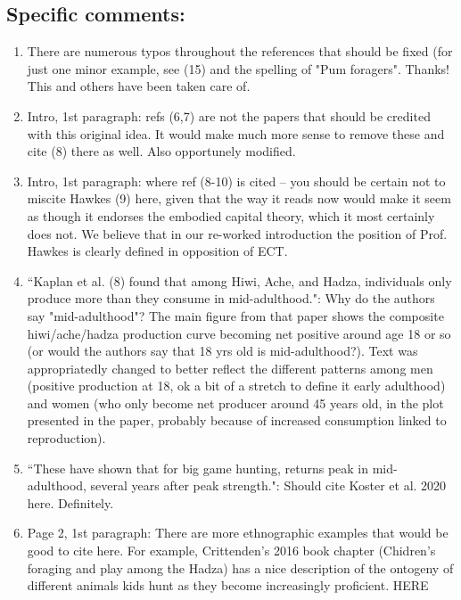 \documentclass{article}
\newcommand{\rev}[1]{{\color{ForestGreen}#1}}
\begin{document}
\subsection{Specific comments:}

\begin{enumerate}
    \item There are numerous typos throughout the references that should be fixed (for just one minor example, see (15) and the spelling of "Pum foragers". \rev{Thanks! This and others have been taken care of.}
    
    \item Intro, 1st paragraph: refs (6,7) are not the papers that should be credited with this original idea. It  would make much more sense to remove these and cite (8) there as well. \rev{Also opportunely modified.}
    
    \item Intro, 1st paragraph: where ref (8-10) is cited -- you should be certain not to miscite Hawkes (9)  here, given that the way it reads now would make it seem as though it endorses the embodied capital theory, which it most certainly does not. \rev{We believe that in our re-worked introduction the position of Prof. Hawkes is clearly defined in opposition of ECT. }
    
    \item ``Kaplan et al. (8) found that among Hiwi, Ache, and Hadza, individuals only produce more than they consume in mid-adulthood.": Why do the authors say "mid-adulthood"? The main figure  from that paper shows the composite hiwi/ache/hadza production curve becoming net positive  around age 18 or so (or would the authors say that 18 yrs old is mid-adulthood?). \rev{Text was appropriatedly changed to better reflect the different patterns among men (positive production at 18, ok a bit of a stretch to define it early adulthood) and women (who only become net producer around 45 years old, in the plot presented in the paper, probably because of increased consumption linked to reproduction). }
    
    \item  ``These have shown that for big game hunting, returns peak in mid-adulthood, several years after peak strength.": Should cite Koster et al. 2020 here. \rev{Definitely.}
    
    \item Page 2, 1st paragraph: There are more ethnographic examples that would be good to cite here. For example, Crittenden's 2016 book chapter (Chidren's foraging and play among the Hadza) has a nice description of the ontogeny of different animals kids hunt as they become increasingly  proficient. \rev{HERE}
    

\end{enumerate}
\end{document}
